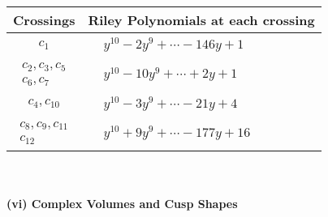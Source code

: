 \documentclass[1p]{elsarticle_modified}
\theoremstyle{definition}
\begin{document}
\begin{tabular}{m{50pt}|m{274pt}}
Crossings & \hspace{64pt}Riley Polynomials at each crossing \\
\hline $$\begin{aligned}c_{1}\end{aligned}$$&$\begin{aligned}
&y^{10}-2 y^9+\cdots-146 y+1
\end{aligned}$\\
\hline $$\begin{aligned}c_{2},c_{3},c_{5}\\c_{6},c_{7}\end{aligned}$$&$\begin{aligned}
&y^{10}-10 y^9+\cdots+2 y+1
\end{aligned}$\\
\hline $$\begin{aligned}c_{4},c_{10}\end{aligned}$$&$\begin{aligned}
&y^{10}-3 y^9+\cdots-21 y+4
\end{aligned}$\\
\hline $$\begin{aligned}c_{8},c_{9},c_{11}\\c_{12}\end{aligned}$$&$\begin{aligned}
&y^{10}+9 y^9+\cdots-177 y+16
\end{aligned}$\\
\hline
\end{tabular}\\~\\
\newpage\flushleft \textbf{(vi) Complex Volumes and Cusp Shapes}
\end{document}
